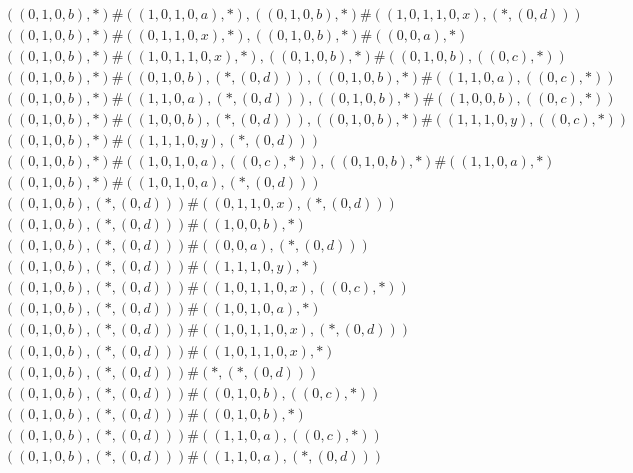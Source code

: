 \begin{align*}
	 & \qquad ((0, 1, 0, b), *) \# ((1, 0, 1, 0, a), *), ((0, 1, 0, b), *) \# ((1, 0, 1, 1, 0, x), (*, (0, d))) \\ 
	 & \qquad ((0, 1, 0, b), *) \# ((0, 1, 1, 0, x), *), ((0, 1, 0, b), *) \# ((0, 0, a), *) \\ 
	 & \qquad ((0, 1, 0, b), *) \# ((1, 0, 1, 1, 0, x), *), ((0, 1, 0, b), *) \# ((0, 1, 0, b), ((0, c), *)) \\ 
	 & \qquad ((0, 1, 0, b), *) \# ((0, 1, 0, b), (*, (0, d))), ((0, 1, 0, b), *) \# ((1, 1, 0, a), ((0, c), *)) \\ 
	 & \qquad ((0, 1, 0, b), *) \# ((1, 1, 0, a), (*, (0, d))), ((0, 1, 0, b), *) \# ((1, 0, 0, b), ((0, c), *)) \\ 
	 & \qquad ((0, 1, 0, b), *) \# ((1, 0, 0, b), (*, (0, d))), ((0, 1, 0, b), *) \# ((1, 1, 1, 0, y), ((0, c), *)) \\ 
	 & \qquad ((0, 1, 0, b), *) \# ((1, 1, 1, 0, y), (*, (0, d))) \\ 
	 & \qquad ((0, 1, 0, b), *) \# ((1, 0, 1, 0, a), ((0, c), *)), ((0, 1, 0, b), *) \# ((1, 1, 0, a), *) \\ 
	 & \qquad ((0, 1, 0, b), *) \# ((1, 0, 1, 0, a), (*, (0, d))) \\ 
	 & \qquad ((0, 1, 0, b), (*, (0, d))) \# ((0, 1, 1, 0, x), (*, (0, d))) \\ 
	 & \qquad ((0, 1, 0, b), (*, (0, d))) \# ((1, 0, 0, b), *) \\ 
	 & \qquad ((0, 1, 0, b), (*, (0, d))) \# ((0, 0, a), (*, (0, d))) \\ 
	 & \qquad ((0, 1, 0, b), (*, (0, d))) \# ((1, 1, 1, 0, y), *) \\ 
	 & \qquad ((0, 1, 0, b), (*, (0, d))) \# ((1, 0, 1, 1, 0, x), ((0, c), *)) \\ 
	 & \qquad ((0, 1, 0, b), (*, (0, d))) \# ((1, 0, 1, 0, a), *) \\ 
	 & \qquad ((0, 1, 0, b), (*, (0, d))) \# ((1, 0, 1, 1, 0, x), (*, (0, d))) \\ 
	 & \qquad ((0, 1, 0, b), (*, (0, d))) \# ((1, 0, 1, 1, 0, x), *) \\ 
	 & \qquad ((0, 1, 0, b), (*, (0, d))) \# (*, (*, (0, d))) \\ 
	 & \qquad ((0, 1, 0, b), (*, (0, d))) \# ((0, 1, 0, b), ((0, c), *)) \\ 
	 & \qquad ((0, 1, 0, b), (*, (0, d))) \# ((0, 1, 0, b), *) \\ 
	 & \qquad ((0, 1, 0, b), (*, (0, d))) \# ((1, 1, 0, a), ((0, c), *)) \\ 
	 & \qquad ((0, 1, 0, b), (*, (0, d))) \# ((1, 1, 0, a), (*, (0, d))) \\ 

\end{align*}
